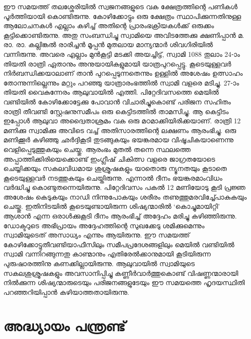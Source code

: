 \documentclass[12pt,openany]{book}
\begin{document}
	ഈ സമയത്ത് തലശ്ശേരിയിൽ സ്വജനങ്ങളുടെ വക ക്ഷേത്രത്തിന്റെ പണികൾ പൂർത്തിയായി കൊണ്ടിരുന്നു. കോഴിക്കോട്ടും ഒരു ക്ഷേത്രം സ്ഥാപിക്കുന്നതിനുള്ള ആലോചനകൾ എല്ലാം കഴിച്ച് അതിന്റെ പ്രാരംഭക്രിയകൾക്ക് ഒരുക്കം കൂട്ടിക്കൊണ്ടിരുന്നു. അതു സംബന്ധിച്ചു സ്വാമിയെ അവിടത്തേക്കു ക്ഷണിപ്പാൻ മ. രാ. രാ. കല്ലിങ്കൽ രാരിച്ചൻ മൂപ്പൻ മുതലായ മാന്യന്മാർ ശിവഗിരിയിൽ വന്നിരുന്നു. അവരെ എല്ലാം മുൻകൂട്ടി മടക്കി അയച്ചിട്ട്, സ്വാമി 1088 തുലാം 24-ാം തിയതി രാത്രി ഏതാനും അനുയായികളുമായി യാത്രപുറപ്പെട്ടു. കൂടെയുള്ളവർ നിർബന്ധിക്കയാലാണ് താൻ പുറപ്പെടുന്നതെന്നും ഉള്ളിൽ അശേഷം ഉത്സാഹം തോന്നുന്നില്ലെന്നും മറ്റും പറഞ്ഞു യാത്രാരംഭത്തിൽ സ്വാമി വളരെ മടിച്ചു. 27-ാം തിയതി വൈകുന്നേരം ആലുവായിൽ എത്തി. പിറ്റേദിവസത്തെ മെയിൽ വണ്ടിയിൽ കോഴിക്കോട്ടേക്കു പോവാൻ വിചാരിച്ചുകൊണ്ട് പരിജന സഹിതം രാത്രി തീവണ്ടി സ്റ്റേഷനുസമീപം ഒരു കെട്ടിടത്തിൽ താമസിച്ചു. ആ കെട്ടിടം ഇപ്പോൾ ആലുവാ അദ്വൈതാശ്രമം വക ഒരു മഠമാക്കിയിരിക്കയാണ്. രാത്രി 12 മണിക്കു സ്വാമിക്കു അവിടെ വച്ച് അതിസാരത്തിന്റെ ലക്ഷണം ആരംഭിച്ചു. ഒരു മണിക്കൂർ കഴിഞ്ഞു ഛർദ്ദികൂടി തുടങ്ങുകയും ഭയങ്കരമായ വിഷൂചികയാണെന്നു വെളിപ്പെടുത്തുകയും ചെയ്തു. ആരംഭം മുതൽ തന്നെ സ്ഥലത്തെ അപ്പാത്തിക്കിരിയെക്കൊണ്ട് ഇംഗ്ലീഷ് ചികിത്സ വളരെ ജാഗ്രതയോടെ ചെയ്യിക്കയും സകലവിധമായ ശുശ്രൂഷകളും യാതൊരു ന്യൂനതയും കൂടാതെ കൂടെയുള്ളവർ നടത്തുകയും ചെയ്തിരുന്നു. എന്നാൽ ദീനം ഭയങ്കരമാംവിധം വർദ്ധിച്ചു കൊണ്ടുതന്നെയിരുന്നു. പിറ്റേദിവസം പകൽ 12 മണിയോടു കൂടി പ്രജ്ഞ അശേഷം കെടുകയും നാഡി നിന്നുപോകയും ശരീരം തണുത്തുമരവിച്ച്പോകുകയും ചെയ്തു. ഇതിനിടയിൽ കൂടെയുണ്ടായിരുന്ന ശിഷ്യന്മാരിൽ `കൊച്ചുമായിറ്റി' ആശാൻ എന്ന ഒരാൾക്കുകൂടി ദീനം ആരംഭിച്ച് അദ്ദേഹം മരിച്ചു കഴിഞ്ഞിരുന്നു. ഡോക്ടറുടെ അഭിപ്രായം അദ്ദേഹത്തിന്റെ സുഖക്കേടു ശമിക്കുമെന്നും സ്വാമിയുടെത് അസാധ്യം എന്നും ആയിരുന്നു. ഈ സമയത്ത് കോഴിക്കോട്ടുതീവണ്ടിയാഫീസിലും സമീപപ്രദേശങ്ങളിലും മെയിൽ വണ്ടിയിൽ സ്വാമി വന്നിറങ്ങുന്നതു കാണ്മാനും എതിരേൽക്കാനുമായി കൂടിയിരുന്ന പുരുഷാരത്തിനു കണക്കില്ലായിരുന്നു. ആലുവായിൽ സ്വാമിയുടെ സകലശുശ്രൂഷകളും അവസാനിപ്പിച്ചു കണ്ണീർവാർത്തുകൊണ്ട് വിഷണ്ണന്മാരായി നിൽക്കുന്ന ശിഷ്യന്മാരുടെയും പരിജനങ്ങളുടേയും ഈ സമയത്തെ ഹൃദയസ്ഥിതി പറഞ്ഞറിയിപ്പാൻ കഴിയാത്തതായിരുന്നു.
	
	\newpage
	\chapter*{അദ്ധ്യായം പന്ത്രണ്ട്}
	
\end{document}
